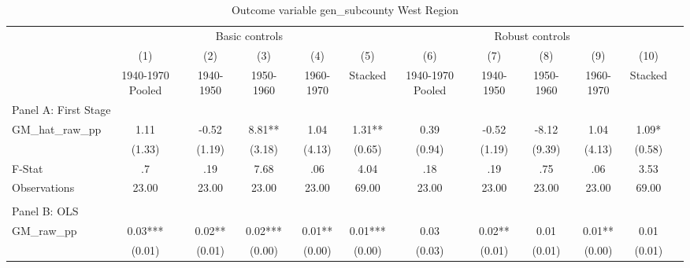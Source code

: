  \begin{table}[htbp]\centering {} \begin{threeparttable} \caption{Outcome variable gen\_subcounty West Region} \begin{tabular}{l*{11}{c}} \toprule
          &\multicolumn{5}{c}{Basic controls}                                   &\multicolumn{5}{c}{Robust controls}                                  \\\cmidrule(lr){2-6}\cmidrule(lr){7-11}
          &\multicolumn{1}{c}{(1)}&\multicolumn{1}{c}{(2)}&\multicolumn{1}{c}{(3)}&\multicolumn{1}{c}{(4)}&\multicolumn{1}{c}{(5)}&\multicolumn{1}{c}{(6)}&\multicolumn{1}{c}{(7)}&\multicolumn{1}{c}{(8)}&\multicolumn{1}{c}{(9)}&\multicolumn{1}{c}{(10)}\\
          &\multicolumn{1}{c}{1940-1970 Pooled}&\multicolumn{1}{c}{1940-1950}&\multicolumn{1}{c}{1950-1960}&\multicolumn{1}{c}{1960-1970}&\multicolumn{1}{c}{Stacked}&\multicolumn{1}{c}{1940-1970 Pooled}&\multicolumn{1}{c}{1940-1950}&\multicolumn{1}{c}{1950-1960}&\multicolumn{1}{c}{1960-1970}&\multicolumn{1}{c}{Stacked}\\
\cmidrule(lr){1-11}
\multicolumn{10}{l}{Panel A: First Stage}\\
\cmidrule(lr){1-11}
GM\_hat\_raw\_pp&      1.11   &     -0.52   &      8.81** &      1.04   &      1.31** &      0.39   &     -0.52   &     -8.12   &      1.04   &      1.09*  \\
          &    (1.33)   &    (1.19)   &    (3.18)   &    (4.13)   &    (0.65)   &    (0.94)   &    (1.19)   &    (9.39)   &    (4.13)   &    (0.58)   \\
\midrule
F-Stat    &        .7   &       .19   &      7.68   &       .06   &      4.04   &       .18   &       .19   &       .75   &       .06   &      3.53   \\
Observations&     23.00   &     23.00   &     23.00   &     23.00   &     69.00   &     23.00   &     23.00   &     23.00   &     23.00   &     69.00   \\
\cmidrule[\heavyrulewidth](lr){1-11} \\ \cmidrule[\heavyrulewidth](lr){1-11}
\multicolumn{10}{l}{Panel B: OLS}\\
\cmidrule(lr){1-11}
GM\_raw\_pp &      0.03***&      0.02** &      0.02***&      0.01** &      0.01***&      0.03   &      0.02** &      0.01   &      0.01** &      0.01   \\
          &    (0.01)   &    (0.01)   &    (0.00)   &    (0.00)   &    (0.00)   &    (0.03)   &    (0.01)   &    (0.01)   &    (0.00)   &    (0.01)   \\

\end{tabular}
\end{threeparttable}
\end{table}

